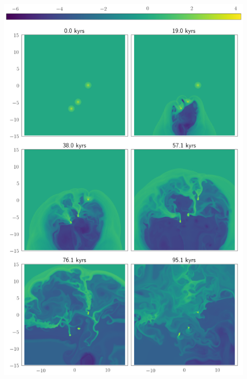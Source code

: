 \documentclass{beamer}
\begin{document}
\begin{frame}%
	\begin{columns}
			\begin{center}
				\includegraphics[width=0.925\linewidth]{../Document/DataImages/JetCloudRHO}
			\end{center}
			\begin{center}

\end{center}
\end{columns}
\end{frame}
\end{document}
